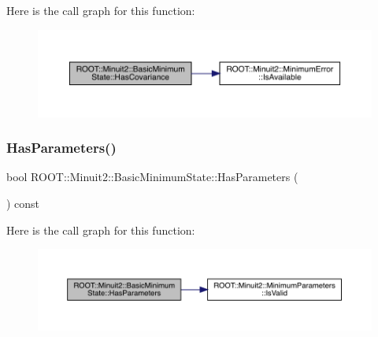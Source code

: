 Here is the call graph for this function\+:
\nopagebreak
\begin{figure}[H]
\begin{center}
\leavevmode
\includegraphics[width=350pt]{d0/db1/classROOT_1_1Minuit2_1_1BasicMinimumState_a9d43155058c576759d062561d77b3e1d_cgraph}
\end{center}
\end{figure}
\mbox{\label{classROOT_1_1Minuit2_1_1BasicMinimumState_a1af83c0464c727dc173834c1612f5e49}} 
\subsubsection{\texorpdfstring{HasParameters()}{HasParameters()}\hspace{0.1cm}{\footnotesize\ttfamily [1/3]}}
{\footnotesize\ttfamily bool R\+O\+O\+T\+::\+Minuit2\+::\+Basic\+Minimum\+State\+::\+Has\+Parameters (\begin{DoxyParamCaption}{ }\end{DoxyParamCaption}) const\hspace{0.3cm}{\ttfamily [inline]}}

Here is the call graph for this function\+:
\nopagebreak
\begin{figure}[H]
\begin{center}
\leavevmode
\includegraphics[width=350pt]{d0/db1/classROOT_1_1Minuit2_1_1BasicMinimumState_a1af83c0464c727dc173834c1612f5e49_cgraph}
\end{center}
\end{figure}
\mbox{\label{classROOT_1_1Minuit2_1_1BasicMinimumState_a1af83c0464c727dc173834c1612f5e49}} 
